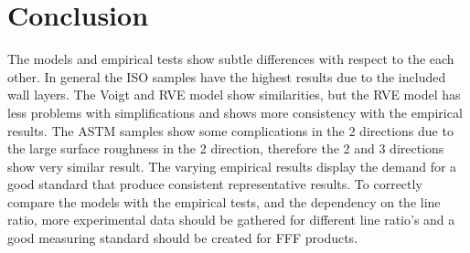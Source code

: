 \section{Conclusion}
The models and empirical tests show subtle differences with respect to the each other. In general the ISO samples have the highest results due to the included wall layers. The Voigt and RVE model show similarities, but the RVE model has less problems with simplifications and shows more consistency with the empirical results. The ASTM samples show some complications  in the 2 directions due to the large surface roughness in the 2 direction, therefore the 2 and 3 directions show very similar result.
The varying empirical results display the demand for a good standard that produce consistent representative results. To correctly compare the models with the empirical tests, and the dependency on the line ratio, more experimental data should be gathered for different line ratio's and a good measuring standard should be created for FFF products.



